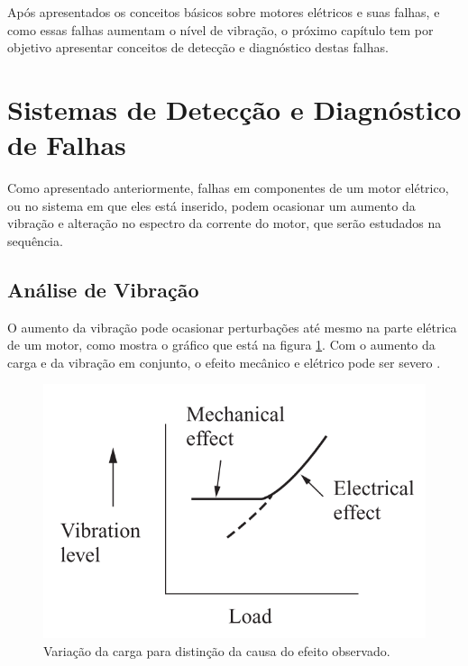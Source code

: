 Após apresentados os conceitos básicos sobre motores elétricos e suas falhas, e como essas falhas aumentam o nível de vibração,
o próximo capítulo tem por objetivo apresentar conceitos de detecção e diagnóstico destas falhas.


% 

\section{Sistemas de Detecção e Diagnóstico de Falhas}\label{sec:}

Como apresentado anteriormente, falhas em componentes de um motor elétrico, ou no sistema em que eles está inserido, podem ocasionar
um aumento da vibração e alteração no espectro da corrente do motor, que serão estudados na sequência.


% 

\subsection{Análise de Vibração}\label{subsec:}

O aumento da vibração pode ocasionar perturbações até mesmo na parte elétrica de um motor, como mostra o gráfico que está na 
figura \ref{fig:fault_effect_randall_p54}. Com o aumento da carga e da vibração em conjunto, o efeito mecânico e elétrico pode ser 
severo .

\begin{figure}[H]
    \caption{Variação da carga para distinção da causa do efeito observado.}
    \begin{center}
        \includegraphics[scale=.45]{referencial/img/fault_effect_randall_p54.png}
    \end{center}
    \label{fig:fault_effect_randall_p54}
\end{figure}


